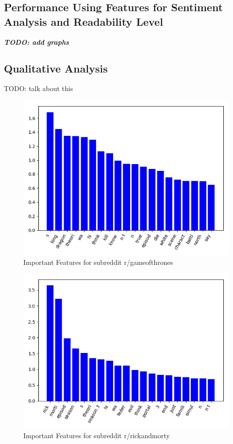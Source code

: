 \documentclass{sig-alternate-05-2015}
\begin{document}
\subsection{Performance Using Features for Sentiment Analysis and Readability Level}

\textit{\textbf{TODO: add graphs}}

\subsection{Qualitative Analysis}
TODO: talk about this

\begin{figure}[H]
\centering
\includegraphics[width=\linewidth]{plots/coefficients-gameofthrones-dim-337.png}
\caption{Important Features for subreddit r/gameofthrones}
\end{figure}

\begin{figure}[H]
\centering
\includegraphics[width=\linewidth]{plots/coefficients-rickandmorty-dim-713.png}
\caption{Important Features for subreddit r/rickandmorty}
\end{figure}
\end{document}
